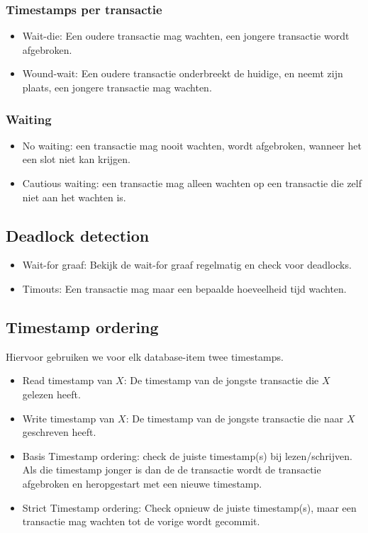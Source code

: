 \documentclass[transacties.tex]{subfiles}
\begin{document}
\subsubsection{Timestamps per transactie}
\begin{itemize}
\item Wait-die: Een oudere transactie mag wachten, een jongere transactie wordt afgebroken.
\item Wound-wait: Een oudere transactie onderbreekt de huidige, en neemt zijn plaats, een jongere transactie mag wachten.
\end{itemize}
\subsubsection{Waiting}
\begin{itemize}
\item No waiting: een transactie mag nooit wachten, wordt afgebroken, wanneer het een slot niet kan krijgen.
\item Cautious waiting: een transactie mag alleen wachten op een transactie die zelf niet aan het wachten is.
\end{itemize}

\subsection{Deadlock detection}
\begin{itemize}
\item Wait-for graaf: Bekijk de wait-for graaf regelmatig en check voor deadlocks.
\item Timouts: Een transactie mag maar een bepaalde hoeveelheid tijd wachten.
\end{itemize}

\subsection{Timestamp ordering}
Hiervoor gebruiken we voor elk database-item twee timestamps.
\begin{itemize}
\item Read timestamp van $X$: De timestamp van de jongste transactie die $X$ gelezen heeft. 
\item Write timestamp van $X$: De timestamp van de jongste transactie die naar $X$ geschreven heeft. 
\end{itemize}

\begin{itemize}
\item Basis Timestamp ordering: check de juiste timestamp(s) bij lezen/schrijven. Als die timestamp jonger is dan de de transactie wordt de transactie afgebroken en heropgestart met een nieuwe timestamp.
\item Strict Timestamp ordering: Check opnieuw de juiste timestamp(s), maar een transactie mag wachten tot de vorige wordt gecommit.
\end{itemize}
\end{document}
